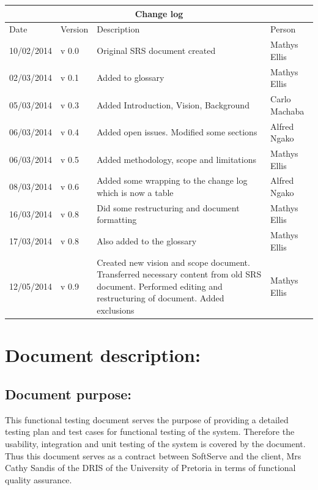 \documentclass[12pt]{article}
\begin{document}
\begin{center}
\begin{tabular}{|l|p{1.4cm}|p{8cm}|p{2.8cm}|}
\hline
\multicolumn{4}{|c|}{\bf Change log} \\
\hline
 Date & Version & Description &  Person \\
\hline
10/02/2014 & v 0.0 & Original SRS document created & Mathys Ellis \\
\hline
02/03/2014 & v 0.1 & Added to glossary & Mathys Ellis \\
\hline
05/03/2014 & v 0.3 & Added Introduction, Vision, Background & Carlo Machaba \\
\hline
06/03/2014 & v 0.4 & Added open issues. Modified some sections & Alfred Ngako \\
\hline
06/03/2014 & v 0.5 & Added methodology, scope and limitations & Mathys Ellis \\
\hline
08/03/2014 & v 0.6 & Added some wrapping to the change log which is now a table & Alfred Ngako \\
\hline
16/03/2014 & v 0.8 & Did some restructuring and document formatting & Mathys Ellis \\
\hline
17/03/2014 & v 0.8 & Also added to the glossary & Mathys Ellis \\
\hline
12/05/2014 & v 0.9 & Created new vision and scope document. Transferred necessary content from old SRS document. Performed editing and restructuring of document. Added exclusions & Mathys Ellis \\
\hline

\end{tabular}
\end{center}
\newpage
\tableofcontents

\listoffigures
\newpage
\section{Document description:}

\subsection{Document purpose:}
\vspace{0.2in}
This functional testing document serves the purpose of providing a detailed testing plan and test cases for functional testing of the system. Therefore the usability, integration and unit testing of the system is covered by the document. Thus this document serves as a contract between SoftServe and the client, Mrs Cathy Sandis of the DRIS of the University of Pretoria in terms of functional quality assurance.
\end{document}
